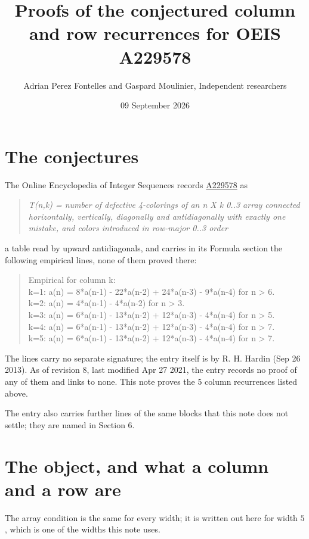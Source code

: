 \documentclass[11pt]{article}
\title{Proofs of the conjectured column and row recurrences for OEIS A229578}
\author{Adrian Perez Fontelles and Gaspard Moulinier, Independent researchers}
\date{09 September 2026}
\theoremstyle{definition}
\begin{document}
\maketitle
\section{The conjectures}

The Online Encyclopedia of Integer Sequences records \href{https://oeis.org/A229578}{A229578} as

\begin{quote}\itshape T(n,k) = number of defective 4-colorings of an n X k 0..3 array connected horizontally, vertically, diagonally and antidiagonally with exactly one mistake, and colors introduced in row-major 0..3 order\end{quote}

a table read by upward antidiagonals, and carries in its Formula section the following empirical lines, none of them proved there:

\begin{quote}\ttfamily Empirical for column k:\\
k=1: a(n) = 8*a(n-1) - 22*a(n-2) + 24*a(n-3) - 9*a(n-4) for n > 6.\\k=2: a(n) = 4*a(n-1) - 4*a(n-2) for n > 3.\\k=3: a(n) = 6*a(n-1) - 13*a(n-2) + 12*a(n-3) - 4*a(n-4) for n > 5.\\k=4: a(n) = 6*a(n-1) - 13*a(n-2) + 12*a(n-3) - 4*a(n-4) for n > 7.\\k=5: a(n) = 6*a(n-1) - 13*a(n-2) + 12*a(n-3) - 4*a(n-4) for n > 7.\end{quote}

The lines carry no separate signature; the entry itself is by R. H. Hardin (Sep 26 2013). As of revision 8, last modified Apr 27 2021, the entry records no proof of any of them and links to none. This note proves the 5 column recurrences listed above.

The entry also carries further lines of the same blocks that this note does not settle; they are named in Section 6.

\section{The object, and what a column and a row are}

The array condition is the same for every width; it is written out here for width $5$, which is one of the widths this note uses.
\end{document}
